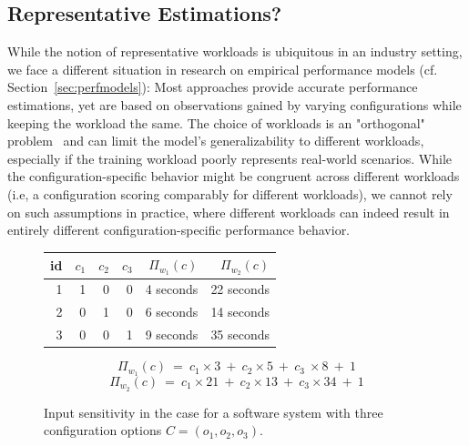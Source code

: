 {\subsection{Representative Estimations?}\label{sec:generalizability}
{\color{edited}
While the notion of representative workloads is ubiquitous in an industry setting, we face a different situation in research on empirical performance models (cf. Section~\ref{sec:perfmodels}): Most approaches provide accurate performance estimations, yet are based on observations gained by varying configurations while keeping the workload the same. The choice of workloads is an "orthogonal" problem~\cite{han_confprof_2021} and can limit the model's generalizability to different workloads, especially if the training workload poorly represents real-world scenarios. While the configuration-specific behavior might be congruent across different workloads (i.e, a configuration scoring comparably for different workloads), we cannot rely on such assumptions in practice, where different workloads can indeed result in entirely different configuration-specific performance behavior.

\begin{figure}
	\centering\footnotesize
	\begin{tabular}{r|rrr|rr}
		\toprule
		id & $c_1$ & $c_2$ &  $c_3$ & $\Pi_{w_1}(c)$ & $\Pi_{w_2}(c)$\\
		\midrule
		1  & \cellcolor{black!15}1 & \cellcolor{black!4}0 & \cellcolor{black!4}0 & \cellcolor{green!10}4 seconds & 22 seconds \\
		2  & \cellcolor{black!4}0 & \cellcolor{black!15}1 & \cellcolor{black!4}0 & 6 seconds & \cellcolor{green!10}14 seconds \\
		3  & \cellcolor{black!4}0 & \cellcolor{black!4}0 & \cellcolor{black!15}1 & 9 seconds & 35 seconds \\
		\bottomrule
	\end{tabular}
	
	$$ \Pi_{w_1}(c) ~=~ c_1 \times 3 ~+~ c_2 \times 5 ~+~ c_3 ~\times 8 ~+~ 1$$
	$$ \Pi_{w_2}(c) ~=~ c_1 \times 21 ~+~ c_2 \times 13 ~+~ c_3 \times 34 ~+~ 1$$
	\caption{Input sensitivity in the case for a software system with three configuration options $C = (o_1, o_2, o_3)$.}
	\label{fig:sensitivity_example}
\end{figure}


}}
